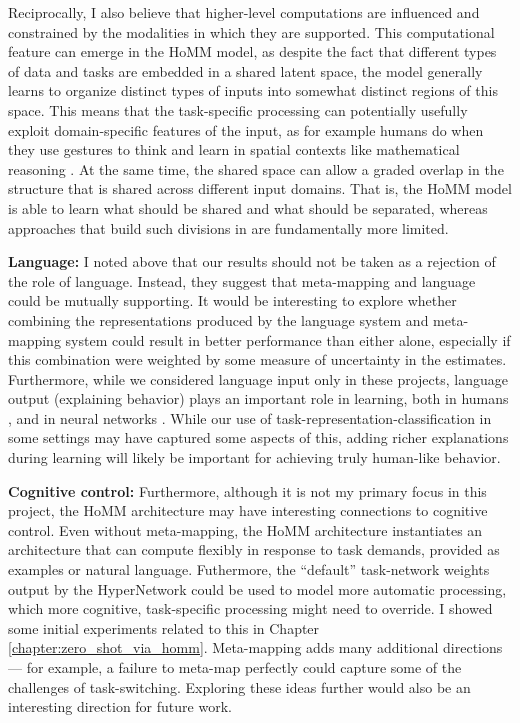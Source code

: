 Reciprocally, I also believe that higher-level computations are influenced and constrained by the modalities in which they are supported. This computational feature can emerge in the HoMM model, as despite the fact that different types of data and tasks are embedded in a shared latent space, the model generally learns to organize distinct types of inputs into somewhat distinct regions of this space. This means that the task-specific processing can potentially usefully exploit domain-specific features of the input, as for example humans do when they use gestures to think and learn in spatial contexts like mathematical reasoning \citep{Goldin-Meadow1999, Wakefield2018}. At the same time, the shared space can allow a graded overlap in the structure that is shared across different input domains. That is, the HoMM model is able to learn what should be shared and what should be separated, whereas approaches that build such divisions in are fundamentally more limited.\par

\textbf{Language:} I noted above that our results should not be taken as a rejection of the role of language. Instead, they suggest that meta-mapping and language could be mutually supporting. It would be interesting to explore whether combining the representations produced by the language system and meta-mapping system could result in better performance than either alone, especially if this combination were weighted by some measure of uncertainty in the estimates. Furthermore, while we considered language input only in these projects, language output (explaining behavior) plays an important role in learning, both in humans \citep{Chi1994}, and in neural networks \citep{Mu2019}. While our use of task-representation-classification in some settings may have captured some aspects of this, adding richer explanations during learning will likely be important for achieving truly human-like behavior. 

\textbf{Cognitive control:} Furthermore, although it is not my primary focus in this project, the HoMM architecture may have interesting connections to cognitive control. Even without meta-mapping, the HoMM architecture instantiates an architecture that can compute flexibly in response to task demands, provided as examples or natural language. Futhermore, the ``default'' task-network weights output by the HyperNetwork could be used to model more automatic processing, which more cognitive, task-specific processing might need to override. I showed some initial experiments related to this in Chapter \ref{chapter:zero_shot_via_homm}. Meta-mapping adds many additional directions --- for example, a failure to meta-map perfectly could capture some of the challenges of task-switching. Exploring these ideas further would also be an interesting direction for future work. \par

